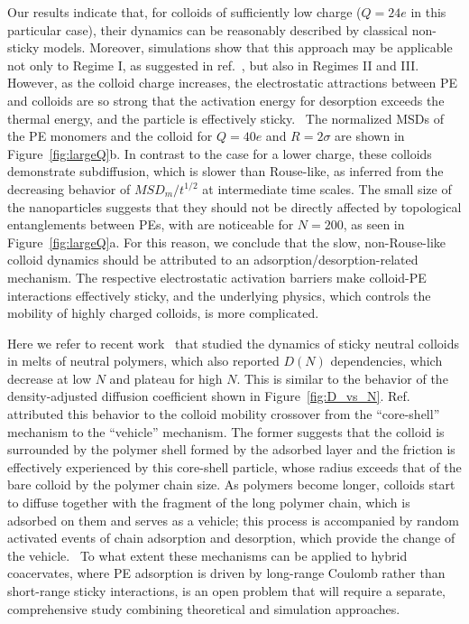 \documentclass[journal=mamobx, manuscript=article]{achemso}
\begin{document}
Our results indicate that, for colloids of sufficiently low charge ($Q = 24e$ in this particular case), their dynamics can be reasonably described by classical non-sticky models. Moreover, simulations show that this approach may be applicable not only to Regime I, as suggested in ref.~, but also in Regimes II and III. However, as the colloid charge increases, the electrostatic attractions between PE and colloids are so strong that the activation energy for desorption exceeds the thermal energy, and the particle is effectively sticky.~\cite{artem2022hybrid} The normalized MSDs of the PE monomers and the colloid for $Q = 40e$ and $R = 2 \sigma$ are shown in Figure~\ref{fig:largeQ}b. In contrast to the case for a lower charge, these colloids demonstrate subdiffusion, which is slower than Rouse-like, as inferred from the decreasing behavior of $MSD_{m} / t^{1/2}$ at intermediate time scales. The small size of the nanoparticles suggests that they should not be directly affected by topological entanglements between PEs, with are noticeable for $N = 200$, as seen in Figure~\ref{fig:largeQ}a. For this reason, we conclude that the slow, non-Rouse-like colloid dynamics should be attributed to an adsorption/desorption-related mechanism. The respective electrostatic activation barriers make colloid-PE interactions effectively sticky, and the underlying physics, which controls the mobility of highly charged colloids, is more complicated.

Here we refer to recent work~\cite{yamamoto2018theory} that studied the dynamics of sticky neutral colloids in melts of neutral polymers, which also reported $D (N)$ dependencies, which decrease at low $N$ and plateau for high $N$. This is similar to the behavior of the density-adjusted diffusion coefficient shown in Figure~\ref{fig:D_vs_N}. Ref.~ attributed this behavior to the colloid mobility crossover from the ``core-shell'' mechanism to the ``vehicle'' mechanism. The former suggests that the colloid is surrounded by the polymer shell formed by the adsorbed layer and the friction is effectively experienced by this core-shell particle, whose radius exceeds that of the bare colloid by the polymer chain size. As polymers become longer, colloids start to diffuse together with the fragment of the long polymer chain, which is adsorbed on them and serves as a vehicle; this process is accompanied by random activated events of chain adsorption and desorption, which provide the change of the vehicle.~\cite{yamamoto2018theory} To what extent these mechanisms can be applied to hybrid coacervates, where PE adsorption is driven by long-range Coulomb rather than short-range sticky interactions, is an open problem that will require a separate, comprehensive study combining theoretical and simulation approaches. 
\end{document}
